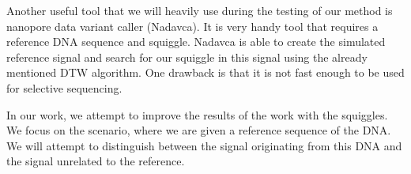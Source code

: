 Another useful tool that we will heavily use during the testing of our method is
nanopore data variant caller (Nadavca). It is very handy tool that requires a reference
DNA sequence and squiggle. Nadavca is able to create the simulated reference signal
and search for our squiggle in this signal using the already mentioned DTW algorithm.
One drawback is that it is not fast enough to be used for selective sequencing.

In our work, we attempt to improve the results of the work with the squiggles.
We focus on the scenario, where we are given a reference sequence of the DNA. We
will attempt to distinguish between the signal originating from this DNA and the
signal unrelated to the reference.

